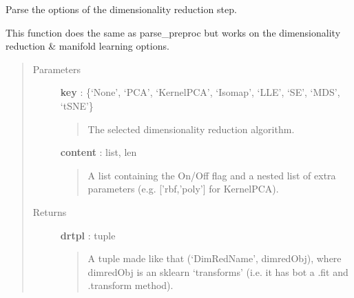 \documentclass[letterpaper,10pt,english]{sphinxmanual}
\begin{document}
\begin{fulllineitems}
\label{index:adenine.core.define_pipeline.parse_dimred}
Parse the options of the dimensionality reduction step.

This function does the same as parse\_preproc but works on the dimensionality reduction \& manifold learning options.
\begin{quote}\begin{description}
\item[{Parameters}] \leavevmode
\textbf{key} : \{`None', `PCA', `KernelPCA', `Isomap', `LLE', `SE', `MDS', `tSNE'\}
\begin{quote}

The selected dimensionality reduction algorithm.
\end{quote}

\textbf{content} : list, len
\begin{quote}

A list containing the On/Off flag and a nested list of extra parameters (e.g. {[}'rbf,'poly'{]} for KernelPCA).
\end{quote}

\item[{Returns}] \leavevmode
\textbf{drtpl} : tuple
\begin{quote}

A tuple made like that (`DimRedName', dimredObj), where dimredObj is an sklearn `transforms' (i.e. it has bot a .fit and .transform method).
\end{quote}

\end{description}\end{quote}

\end{fulllineitems}

\end{document}
